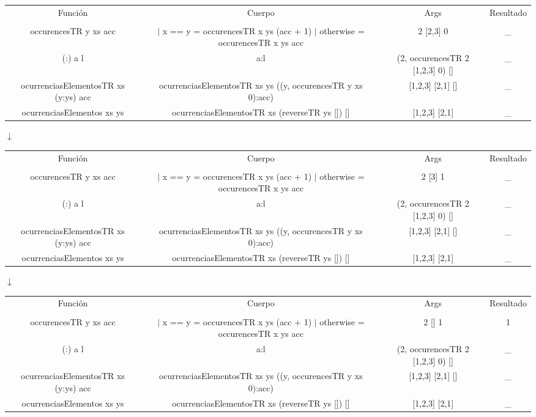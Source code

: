 \begin{enumerate}
{\begin{itemize}
{\begin{center}
                \begin{NiceTabular}{|c c c c|}
                    Función & Cuerpo & Args & Resultado \\
                    &&&\\
                    occurencesTR y xs acc & $|$ x == y = occurencesTR x ys (acc + 1) $|$ otherwise = occurencesTR x ys acc & 2 [2,3] 0 & \_ \\ \hline
                    (:) a l & a:l & (2, occurencesTR 2 [1,2,3] 0) [] & \_ \\ \hline
                    ocurrenciasElementosTR xs (y:ys) acc & ocurrenciasElementosTR xs ys ((y, occurencesTR y xs 0):acc) & [1,2,3] [2,1] [] & \_ \\ \hline
                    ocurrenciasElementos xs ys & ocurrenciasElementosTR xs (reverseTR ys []) [] & [1,2,3] [2,1] & \_ \\ \hline
                \end{NiceTabular}

                $\downarrow$
                
                \begin{NiceTabular}{|c c c c|}
                    Función & Cuerpo & Args & Resultado \\
                    &&&\\
                    occurencesTR y xs acc & $|$ x == y = occurencesTR x ys (acc + 1) $|$ otherwise = occurencesTR x ys acc & 2 [3] 1 & \_ \\ \hline
                    (:) a l & a:l & (2, occurencesTR 2 [1,2,3] 0) [] & \_ \\ \hline
                    ocurrenciasElementosTR xs (y:ys) acc & ocurrenciasElementosTR xs ys ((y, occurencesTR y xs 0):acc) & [1,2,3] [2,1] [] & \_ \\ \hline
                    ocurrenciasElementos xs ys & ocurrenciasElementosTR xs (reverseTR ys []) [] & [1,2,3] [2,1] & \_ \\ \hline
                \end{NiceTabular}

                $\downarrow$
                
                \begin{NiceTabular}{|c c c c|}
                    Función & Cuerpo & Args & Resultado \\
                    &&&\\
                    occurencesTR y xs acc & $|$ x == y = occurencesTR x ys (acc + 1) $|$ otherwise = occurencesTR x ys acc & 2 [] 1 & 1 \\ \hline
                    (:) a l & a:l & (2, occurencesTR 2 [1,2,3] 0) [] & \_ \\ \hline
                    ocurrenciasElementosTR xs (y:ys) acc & ocurrenciasElementosTR xs ys ((y, occurencesTR y xs 0):acc) & [1,2,3] [2,1] [] & \_ \\ \hline
                    ocurrenciasElementos xs ys & ocurrenciasElementosTR xs (reverseTR ys []) [] & [1,2,3] [2,1] & \_ \\ \hline
                \end{NiceTabular}


\end{center}}
\end{itemize}}
\end{enumerate}
